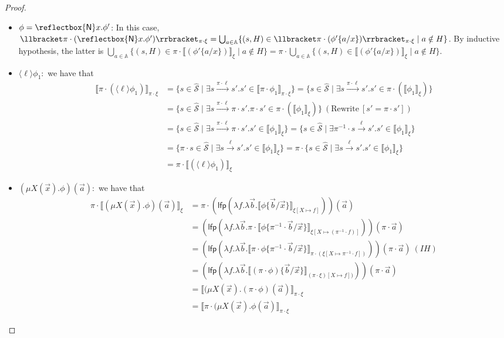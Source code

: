 \documentclass[10pt,a4paper]{article}
\theoremstyle{definition}
\theoremstyle{remark}
\newcommand\new[0]{\reflectbox{\ensuremath{\mathsf{N}}}}
\newcommand\fresh[1]{\new #1.}
\newcommand\diam[1]{\langle#1\rangle}
\newcommand\sem[2][\xi]{\llbracket#2\rrbracket_{#1}}
\newcommand\semp[2][\pi\cdot\xi]{\llbracket\pi\cdot #2\rrbracket_{#1}}
\newcommand\Scal{\mathcal{S}}
\newcommand\Atoms{\mathbb{A}}
\newcommand\lfp{\mathsf{lfp}}
\newcommand\fstates[0]{\hat{\Scal}}
\begin{document}
\begin{proof}
\begin{itemize}
		\item $\phi=\fresh{x}\phi'$:
		In this case, $\semp{(\fresh{x}\phi')} = \bigcup_{a\in\Atoms}\{(s, H) \in \semp{(\phi'\{a/x\})} \mid a \notin H\}$. 
		By inductive hypothesis, the latter is $\bigcup_{a\in\Atoms}\{(s, H) \in \pi \cdot \sem{(\phi'\{a/x\})} \mid a \notin H\}
				=\pi \cdot \bigcup_{a\in\Atoms}\{(s, H) \in \sem{(\phi'\{a/x\})} \mid a \notin H\}$.
		\item $\diam{\ell}\phi_1:$ we have that
		\begin{align*}
			\semp{(\diam{\ell}\phi_1)} &= \{s\in\fstates\mid\exists s\xrightarrow{\pi\cdot\ell} s' . s' \in \semp{\phi_1}\}
			= \{s\in\fstates\mid\exists s\xrightarrow{\pi\cdot\ell} s' . s' \in \pi\cdot(\sem{\phi_1})\}\\
			&= \{s\in\fstates\mid\exists s\xrightarrow{\pi\cdot\ell} \pi\cdot s' . \pi\cdot s' \in \pi\cdot(\sem{\phi_1})\}\ (\text{Rewrite}\ [s' = \pi\cdot s'])\\ 
			&= \{s\in\fstates\mid\exists s\xrightarrow{\pi\cdot\ell} \pi\cdot s' . s' \in \sem{\phi_1}\}
			= \{s\in\fstates\mid\exists \pi^{-1}\cdot s\xrightarrow{\ell} s' . s' \in \sem{\phi_1}\}\\
			&= \{\pi\cdot s\in\fstates\mid\exists s\xrightarrow{\ell} s' . s' \in \sem{\phi_1}\}
			= \pi\cdot\{s\in\fstates\mid\exists s\xrightarrow{\ell} s' . s' \in \sem{\phi_1}\}\\
			&= \pi\cdot\sem{(\diam{\ell}\phi_1)}
		\end{align*}
		\item $(\mu X(\vec x).\phi)(\vec a):$ we have that
    \begin{align*}
	\pi\cdot \sem{(\mu X(\vec x).\phi)(\vec a)} &= \pi\cdot(\lfp(\lambda f.\lambda\vec b. \sem[{\xi[X\mapsto f]}]{\phi\{\vec b/\vec x\}}))(\vec a)\\
	&= (\lfp(\lambda f.\lambda\vec b. \pi\cdot\sem[{\xi[X\mapsto (\pi^{-1}\cdot f)]}]{\phi\{\pi^{-1} \cdot \vec b/\vec x\}}))(\pi\cdot \vec a)\\
	&= (\lfp(\lambda f.\lambda\vec b. \semp[\pi\cdot(\xi{[X\mapsto \pi^{-1}\cdot f]})]{\phi\{\pi^{-1}\cdot \vec b / \vec x\}}))(\pi\cdot \vec a)\ (IH)\\
	&= (\lfp(\lambda f.\lambda\vec b. \sem[(\pi\cdot\xi){[X\mapsto f]})]{(\pi \cdot\phi)\{\vec b / \vec x\}}))(\pi\cdot \vec a)\\
	&= \sem[\pi\cdot\xi]{(\mu X(\vec x).(\pi\cdot\phi)(\vec a)}\\
	&= \semp{(\mu X(\vec x).\phi(\vec a)}
\end{align*}
		
	\end{itemize}
\end{proof}
\end{document}
